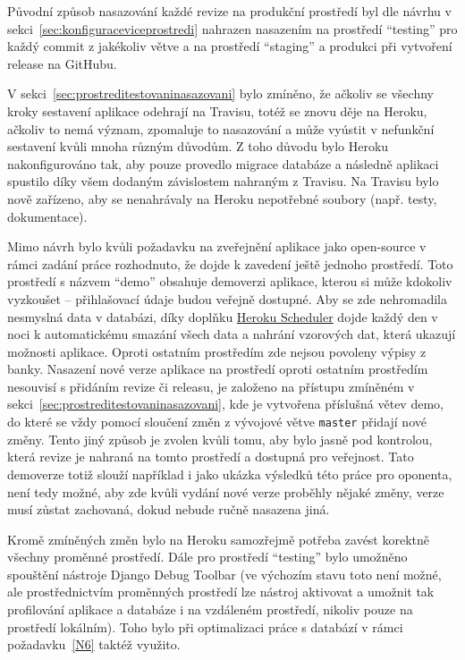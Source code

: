 Původní způsob nasazování každé revize na produkční prostředí byl dle návrhu v sekci~\ref{sec:konfiguraceviceprostredi} nahrazen nasazením na prostředí \enquote{testing} pro každý commit z jakékoliv větve a na prostředí \enquote{staging} a produkci při vytvoření release na GitHubu.

V sekci~\ref{sec:prostreditestovaninasazovani} bylo zmíněno, že ačkoliv se všechny kroky sestavení aplikace odehrají na Travisu, totéž se znovu děje na Heroku, ačkoliv to nemá význam, zpomaluje to nasazování a může vyústit v nefunkční sestavení kvůli mnoha různým důvodům. Z toho důvodu bylo Heroku nakonfigurováno tak, aby pouze provedlo migrace databáze a následně aplikaci spustilo díky všem dodaným závislostem nahraným z Travisu. Na Travisu bylo nově zařízeno, aby se nenahrávaly na Heroku nepotřebné soubory (např. testy, dokumentace).

Mimo návrh bylo kvůli požadavku na zveřejnění aplikace jako open-source v rámci zadání práce rozhodnuto, že dojde k zavedení ještě jednoho prostředí. Toto prostředí s názvem \enquote{demo} obsahuje demoverzi aplikace, kterou si může kdokoliv vyzkoušet -- přihlašovací údaje budou veřejně dostupné. Aby se zde nehromadila nesmyslná data v databázi, díky doplňku \href{https://devcenter.heroku.com/articles/scheduler}{Heroku Scheduler} dojde každý den v noci k automatickému smazání všech data a nahrání vzorových dat, která ukazují možnosti aplikace. Oproti ostatním prostředím zde nejsou povoleny výpisy z banky. Nasazení nové verze aplikace na prostředí oproti ostatním prostředím nesouvisí s přidáním revize či releasu, je založeno na přístupu zmíněném v sekci~\ref{sec:prostreditestovaninasazovani}, kde je vytvořena příslušná větev demo, do které se vždy pomocí sloučení změn z vývojové větve \verb|master| přidají nové změny. Tento jiný způsob je zvolen kvůli tomu, aby bylo jasně pod kontrolou, která revize je nahraná na tomto prostředí a dostupná pro veřejnost. Tato demoverze totiž slouží například i jako ukázka výsledků této práce pro oponenta, není tedy možné, aby zde kvůli vydání nové verze proběhly nějaké změny, verze musí zůstat zachovaná, dokud nebude ručně nasazena jiná.

Kromě zmíněných změn bylo na Heroku samozřejmě potřeba zavést korektně všechny proměnné prostředí. Dále pro prostředí \enquote{testing} bylo umožněno spouštění nástroje Django Debug Toolbar (ve výchozím stavu toto není možné, ale prostřednictvím proměnných prostředí lze nástroj aktivovat a umožnit tak profilování aplikace a databáze i na vzdáleném prostředí, nikoliv pouze na prostředí lokálním). Toho bylo při optimalizaci práce s databází v rámci požadavku~\ref{N6} taktéž využito.

